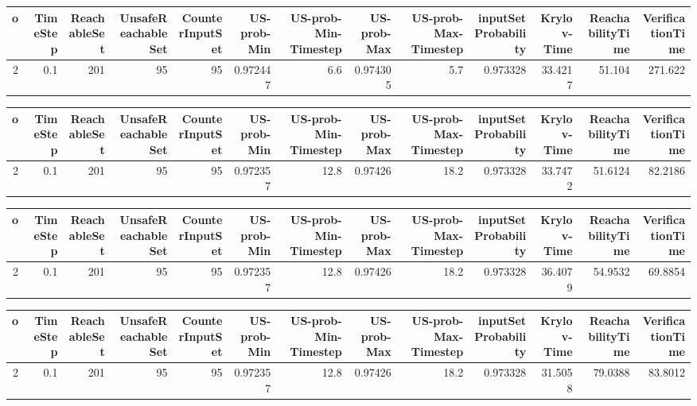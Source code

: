 \begin{tabular}{rrrrrrrrrrrrr}
\hline
   o &   TimeStep &   ReachableSet &   UnsafeReachableSet &   CounterInputSet &   US-prob-Min &   US-prob-Min-Timestep &   US-prob-Max &   US-prob-Max-Timestep &   inputSet Probability &   Krylov-Time &   ReachabilityTime &   VerificationTime \\
\hline
   2 &        0.1 &            201 &                   95 &                95 &      0.972447 &                    6.6 &      0.974305 &                    5.7 &               0.973328 &       33.4217 &             51.104 &            271.622 \\
\hline
\end{tabular}
\begin{tabular}{rrrrrrrrrrrrr}
\hline
   o &   TimeStep &   ReachableSet &   UnsafeReachableSet &   CounterInputSet &   US-prob-Min &   US-prob-Min-Timestep &   US-prob-Max &   US-prob-Max-Timestep &   inputSet Probability &   Krylov-Time &   ReachabilityTime &   VerificationTime \\
\hline
   2 &        0.1 &            201 &                   95 &                95 &      0.972357 &                   12.8 &       0.97426 &                   18.2 &               0.973328 &       33.7472 &            51.6124 &            82.2186 \\
\hline
\end{tabular}
\begin{tabular}{rrrrrrrrrrrrr}
\hline
   o &   TimeStep &   ReachableSet &   UnsafeReachableSet &   CounterInputSet &   US-prob-Min &   US-prob-Min-Timestep &   US-prob-Max &   US-prob-Max-Timestep &   inputSet Probability &   Krylov-Time &   ReachabilityTime &   VerificationTime \\
\hline
   2 &        0.1 &            201 &                   95 &                95 &      0.972357 &                   12.8 &       0.97426 &                   18.2 &               0.973328 &       36.4079 &            54.9532 &            69.8854 \\
\hline
\end{tabular}
\begin{tabular}{rrrrrrrrrrrrr}
\hline
   o &   TimeStep &   ReachableSet &   UnsafeReachableSet &   CounterInputSet &   US-prob-Min &   US-prob-Min-Timestep &   US-prob-Max &   US-prob-Max-Timestep &   inputSet Probability &   Krylov-Time &   ReachabilityTime &   VerificationTime \\
\hline
   2 &        0.1 &            201 &                   95 &                95 &      0.972357 &                   12.8 &       0.97426 &                   18.2 &               0.973328 &       31.5058 &            79.0388 &            83.8012 \\
\hline
\end{tabular}
